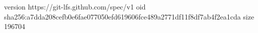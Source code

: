 version https://git-lfs.github.com/spec/v1
oid sha256:a7dda208cefb0e6fae077050efd619606fce489a2771df11f8df7ab4f2ea1cda
size 196704

